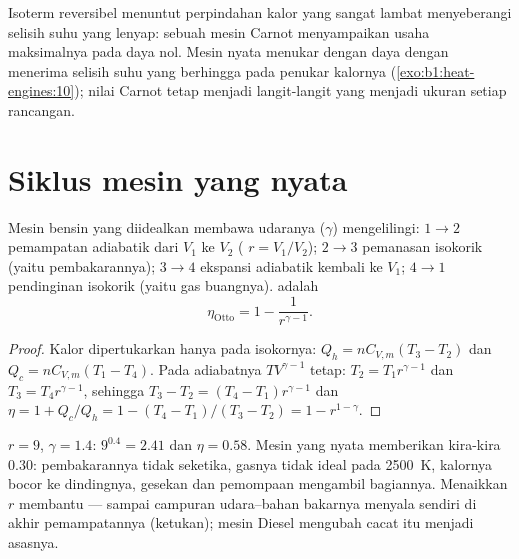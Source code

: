 \begin{remark}\label{rem:b1:heat-engines:notengine}
Isoterm reversibel menuntut perpindahan kalor yang sangat lambat menyeberangi
selisih suhu yang lenyap: sebuah mesin Carnot menyampaikan usaha maksimalnya
pada daya nol. Mesin nyata menukar  dengan daya dengan menerima
selisih suhu yang berhingga pada penukar kalornya
(\cref{exo:b1:heat-engines:10}); nilai Carnot tetap menjadi langit-langit
yang menjadi ukuran setiap rancangan.
\end{remark}

\section{Siklus mesin yang nyata}

\begin{proposition}\label{prop:b1:heat-engines:otto}
Mesin bensin yang diidealkan membawa udaranya ($\gamma$) mengelilingi: $1 \to 2$
pemampatan adiabatik dari $V_1$ ke $V_2$ (\emph{}
$r = V_1/V_2$); $2 \to 3$ pemanasan isokorik (yaitu pembakarannya); $3 \to 4$
ekspansi adiabatik kembali ke $V_1$; $4 \to 1$ pendinginan isokorik (yaitu
gas buangnya).  adalah
\[
\eta_{\text{Otto}} = 1 - \frac{1}{r^{\gamma-1}} .
\]
\end{proposition}

\begin{proof}
Kalor dipertukarkan hanya pada isokornya: $Q_h = nC_{V,m}(T_3 - T_2)$ dan
$Q_c = nC_{V,m}(T_1 - T_4)$. Pada adiabatnya $TV^{\gamma-1}$ tetap:
$T_2 = T_1r^{\gamma-1}$ dan $T_3 = T_4r^{\gamma-1}$, sehingga $T_3 - T_2 =
(T_4 - T_1)r^{\gamma-1}$ dan
$\eta = 1 + Q_c/Q_h = 1 - (T_4 - T_1)/(T_3 - T_2) = 1 - r^{1-\gamma}$.
\end{proof}

\begin{example}\label{ex:b1:heat-engines:ottonumbers}
$r = 9$, $\gamma = 1.4$: $9^{0.4} = 2.41$ dan $\eta = 0.58$. Mesin yang nyata
memberikan kira-kira $0.30$: pembakarannya tidak seketika, gasnya tidak
ideal pada \qty{2500}{K}, kalornya bocor ke dindingnya, gesekan dan pemompaan
mengambil bagiannya. Menaikkan $r$ membantu --- sampai campuran udara--bahan bakarnya
menyala sendiri di akhir pemampatannya (ketukan); mesin Diesel
mengubah cacat itu menjadi asasnya.
\end{example}

